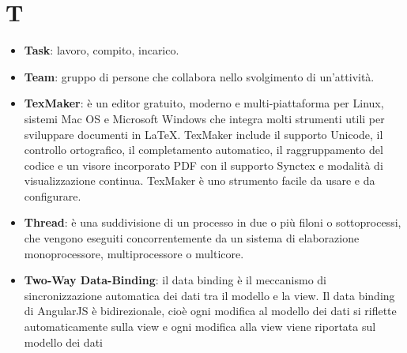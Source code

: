 \section{T}
\begin{itemize}
	\item
	\textbf{Task}: lavoro, compito, incarico.
	\item
	\textbf{Team}: gruppo di persone che collabora nello svolgimento di un'attività.
	\item
	\textbf{TexMaker}: è un editor gratuito, moderno e multi-piattaforma per Linux, sistemi Mac OS e Microsoft Windows che integra molti strumenti utili per sviluppare documenti in \LaTeX.
	TexMaker include il supporto Unicode, il controllo ortografico, il completamento automatico, il raggruppamento del codice e un visore incorporato PDF con il supporto Synctex e modalità di visualizzazione continua.
	TexMaker è uno strumento facile da usare e da configurare.
	\item
	\textbf{Thread}:  è una suddivisione di un processo in due o più filoni o sottoprocessi, che vengono eseguiti concorrentemente da un sistema di elaborazione monoprocessore, multiprocessore o multicore.
	\item
	\textbf{Two-Way Data-Binding}: il data binding è il meccanismo di sincronizzazione automatica dei dati tra il modello e la view. Il data binding di AngularJS è bidirezionale, cioè ogni modifica al modello dei dati si riflette automaticamente sulla view e ogni modifica alla view viene riportata sul modello dei dati
\end{itemize}
